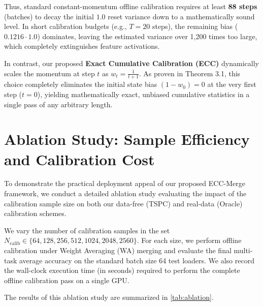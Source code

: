 \documentclass{article}
\theoremstyle{plain}
\theoremstyle{definition}
\theoremstyle{remark}
\begin{document}
Thus, standard constant-momentum offline calibration requires at least \textbf{88 steps} (batches) to decay the initial $1.0$ reset variance down to a mathematically sound level. In short calibration budgets (e.g., $T = 20$ steps), the remaining bias ($0.1216 \cdot 1.0$) dominates, leaving the estimated variance over 1,200 times too large, which completely extinguishes feature activations.

In contrast, our proposed \textbf{Exact Cumulative Calibration (ECC)} dynamically scales the momentum at step $t$ as $w_t = \frac{1}{t+1}$. As proven in Theorem 3.1, this choice completely eliminates the initial state bias $(1 - w_0) = 0$ at the very first step ($t=0$), yielding mathematically exact, unbiased cumulative statistics in a single pass of any arbitrary length.

\section{Ablation Study: Sample Efficiency and Calibration Cost}
\label{ap:ablation}
To demonstrate the practical deployment appeal of our proposed ECC-Merge framework, we conduct a detailed ablation study evaluating the impact of the calibration sample size on both our data-free (TSPC) and real-data (Oracle) calibration schemes. 

We vary the number of calibration samples in the set $N_{\text{calib}} \in \{64, 128, 256, 512, 1024, 2048, 2560\}$. For each size, we perform offline calibration under Weight Averaging (WA) merging and evaluate the final multi-task average accuracy on the standard batch size 64 test loaders. We also record the wall-clock execution time (in seconds) required to perform the complete offline calibration pass on a single GPU.

The results of this ablation study are summarized in \cref{tab:ablation}.
\end{document}
